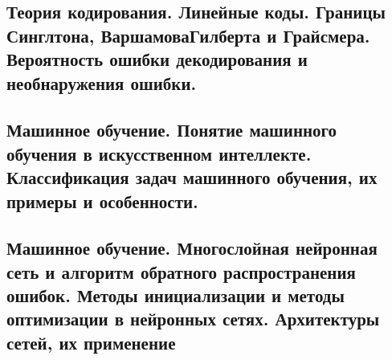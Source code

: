 \documentclass{article}
\begin{document}
\subsection{Теория кодирования. Линейные коды. Границы Синглтона, ВаршамоваГилберта и Грайсмера. Вероятность ошибки декодирования и необнаружения ошибки.}

\subsection{Машинное обучение. Понятие машинного обучения в искусственном интеллекте. Классификация задач машинного обучения, их примеры и особенности.}

\subsection{Машинное обучение. Многослойная нейронная сеть и алгоритм обратного распространения ошибок. Методы инициализации и методы оптимизации в нейронных сетях. Архитектуры сетей, их применение}
\end{document}
